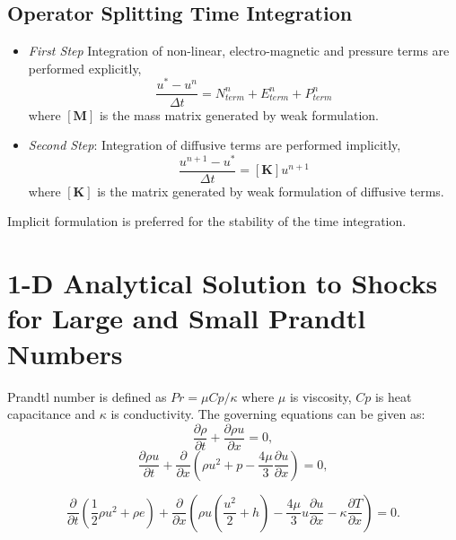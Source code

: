\documentclass[12pt]{report}
\begin{document}
 \subsection{Operator Splitting Time Integration}
 \begin{itemize}
 \item  \emph{ \color{blue} First Step} Integration of non-linear, electro-magnetic and pressure terms are performed explicitly,
 \begin{equation}
[\mathbf{M}]\frac{u^{*}-u^{n}}{\Delta t}=N_{term}^{n}+E_{term}^{n}+P_{term}^{n}
 \end{equation}
 where $[\mathbf{M}]$ is the mass matrix generated by weak formulation.
\item \emph{ \color{blue} Second Step}: Integration of diffusive terms are performed implicitly,
 \begin{equation}
[\mathbf{M}]\frac{u^{n+1}-u^{*}}{\Delta t}=[\mathbf{K}]u^{n+1}
 \end{equation}
 where $[\mathbf{K}]$ is the matrix generated by weak formulation of diffusive terms.
  \end{itemize}
  
 Implicit formulation is preferred for the stability of the time integration.

\section{1-D Analytical Solution to Shocks for Large and Small Prandtl Numbers }
Prandtl number is defined as $Pr=\mu Cp/\kappa$ where $\mu$ is viscosity, $Cp$ is heat capacitance and $\kappa$ is conductivity. The governing equations can be given as:
\begin{equation}
\label{eq:220}
\frac{\partial \rho}{\partial t}+ \frac{\partial \rho u}{\partial x}=0,
\end{equation}
\begin{equation}
\label{eq:221}
\frac{\partial \rho u}{\partial t}+ \frac{\partial }{\partial x}\left ( \rho u^2 +p -\frac{4 \mu}{3}\frac{\partial u}{\partial x} \right )=0,
\end{equation}

\begin{equation}
\label{eq:222}
\frac{\partial }{\partial t}\left ( \frac{1}{2}\rho u^2 + \rho e \right )+ \frac{\partial }{\partial x}\left ( \rho u(\frac{u^2}{2}+h)-\frac{4 \mu}{3}u\frac{\partial u}{\partial x}-\kappa \frac{\partial T}{\partial x} \right )=0.
\end{equation}
\end{document}
